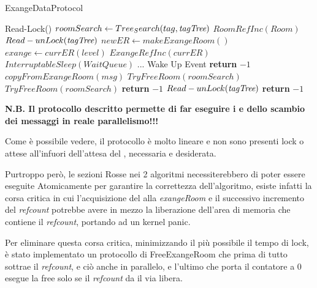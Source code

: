\newpage

\begin{algorithm}
\caption{\Reader ExangeDataProtocol}\label{readExange}
\begin{algorithmic}[1]
\State Read-Lock(\tagTree)
\State $roomSearch \gets Tree_Search(tag, \textit{tagTree})$
    \State $RoomRefInc(Room)$
    \State $Read-unLock(\textit{tagTree})$
        \State $newER \gets makeExangeRoom()$
        {
        \color{red}
        \State $exange \gets currER(level)$
        \State $ExangeRefInc(currER)$
        }
        \State $InterruptableSleep(WaitQueue)$
        \State ...
        \State Wake Up Event
                \State \textbf{return} $-1$
            \EndIf
        \State $copyFromExangeRoom(msg)$ 
        \State $TryFreeRoom(roomSearch)$
    \Else
        \State $TryFreeRoom(roomSearch)$
        \State \textbf{return} $-1$
    \EndIf
\Else
    \State $Read-unLock(\textit{tagTree})$
    \State \textbf{return} $-1$
\EndIf
\EndProcedure
\end{algorithmic}
\end{algorithm}

\textbf{N.B. Il protocollo descritto permette di far eseguire i \Writer e \Reader dello scambio dei messaggi in reale
parallelismo!!!}

Come è possibile vedere, il protocollo è molto lineare e non sono presenti lock o attese all'infuori dell'attesa del
\Reader, necessaria e desiderata.

Purtroppo però, le sezioni {\color{red} Rosse} nei 2 algoritmi necessiterebbero di poter essere eseguite Atomicamente
per garantire la correttezza dell'algoritmo, esiste infatti la corsa critica in cui l'acquisizione del alla
\textit{exangeRoom} e il successivo incremento del \textit{refcount} potrebbe avere in mezzo la liberazione dell'area
di memoria che contiene il \textit{refcount}, portando ad un kernel panic.

Per eliminare questa corsa critica, minimizzando il più possibile il tempo di lock, è stato implementato un
protocollo di FreeExangeRoom che prima di tutto sottrae il \textit{refcount}, e ciò anche in parallelo, e l'ultimo che
porta il contatore a 0 esegue la free solo se il \textit{refcount} da il via libera.


